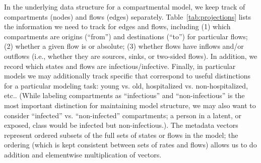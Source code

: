 In the underlying data structure for a compartmental model, we keep track of compartments (nodes) and flows (edges) separately. Table~\ref{tab:projections} lists the information we need to track for edges and flows, including (1) which compartments are origins (``from'') and destinations (``to'') for particular flows; (2) whether a given flow is \pc or absolute; (3) whether flows have inflows and/or outflows (i.e., whether they are sources, sinks, or two-sided flows). In addition, we record which states and flows are infectious/infective. Finally, in particular models we may additionally track specific  that correspond to useful distinctions for a particular modeling task: young vs. old, hospitalized vs. non-hospitalized, etc.. (While labeling compartments as ``infectious'' and ``non-infectious'' is the most important distinction for maintaining model structure, we may also want to consider ``infected'' vs. ``non-infected'' compartments; a person in a latent, or exposed, class would be infected but non-infectious.).
The metadata vectors represent ordered subsets of the full sets of states or flows in the model; the ordering (which is kept consistent between sets of \pc rates and flows) allows us to do addition and elementwise multiplication of vectors.

